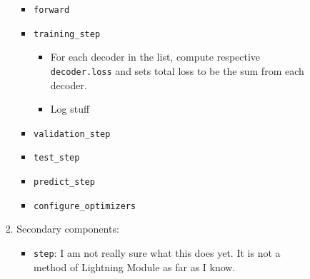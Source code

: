 \begin{itemize}
\begin{enumerate}
\begin{enumerate}
\begin{enumerate}
\begin{itemize}
                                \item \texttt{forward}

                                \item \texttt{training\_step}
                                    \begin{itemize}
                                        \item For each decoder in the list, compute respective \texttt{decoder.loss} and sets total loss to be the sum from each decoder.
                                        \item Log stuff
                                    \end{itemize}

                                \item \texttt{validation\_step}

                                \item \texttt{test\_step}

                                \item \texttt{predict\_step}

                                \item \texttt{configure\_optimizers}
                            \end{itemize}

                            \item Secondary components:
                            \begin{itemize}
                                \item \texttt{step}: I am not really sure what this does yet. It is not a method of Lightning Module as far as I know.
                            \end{itemize}
                        \end{enumerate}

                \end{enumerate}
        \end{enumerate}
\end{itemize}
